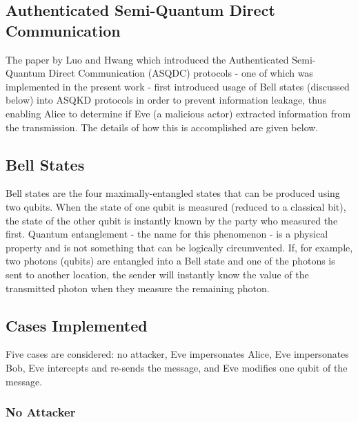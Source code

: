 \documentclass[conference]{IEEEtran}
\begin{document}
\subsection{Authenticated Semi-Quantum Direct Communication}

The paper by Luo and Hwang which introduced the Authenticated Semi-Quantum
Direct Communication (ASQDC) protocols - one of which was implemented
in the present work - first introduced usage of Bell states (discussed
below) into ASQKD protocols in order to prevent information leakage,
thus enabling Alice to determine if Eve (a malicious actor) extracted
information from the transmission. The details of how this is accomplished
are given below.

\subsection{Bell States}

Bell states are the four maximally-entangled states that can be produced
using two qubits. When the state of one qubit is measured (reduced
to a classical bit), the state of the other qubit is instantly known
by the party who measured the first. Quantum entanglement - the name
for this phenomenon - is a physical property and is not something
that can be logically circumvented. If, for example, two photons (qubits)
are entangled into a Bell state and one of the photons is sent to
another location, the sender will instantly know the value of the
transmitted photon when they measure the remaining photon. 

\subsection{Cases Implemented}

Five cases are considered: no attacker, Eve impersonates Alice, Eve
impersonates Bob, Eve intercepts and re-sends the message, and Eve
modifies one qubit of the message.

\subsubsection{No Attacker}
\end{document}
